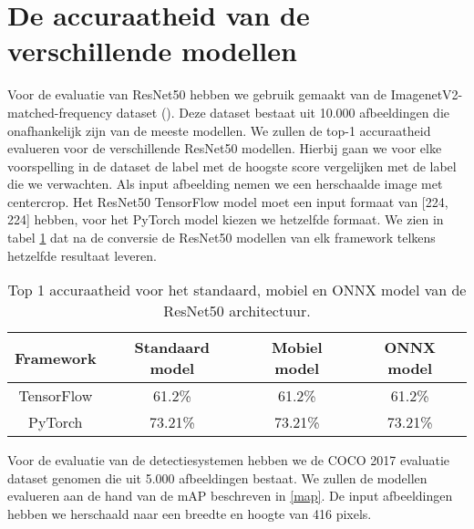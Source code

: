 \section{De accuraatheid van de verschillende modellen}

Voor de evaluatie van ResNet50 hebben we gebruik gemaakt van de ImagenetV2-matched-frequency dataset (\cite{recht2019imagenet}).
Deze dataset bestaat uit 10.000 afbeeldingen die onafhankelijk zijn van de meeste modellen.
We zullen de top-1 accuraatheid evalueren voor de verschillende ResNet50 modellen.
Hierbij gaan we voor elke voorspelling in de dataset de label met de hoogste score vergelijken met de label die we verwachten.
Als input afbeelding nemen we een herschaalde image met centercrop.
Het ResNet50 TensorFlow model moet een input formaat van [224, 224] hebben, voor het PyTorch model kiezen we hetzelfde formaat.
We zien in tabel \ref{tab:class_acc} dat na de conversie de ResNet50 modellen van elk framework telkens hetzelfde resultaat leveren.

\begin{table}[!ht]
    \caption{Top 1 accuraatheid voor het standaard, mobiel en ONNX model van de ResNet50 architectuur.}
\begin{tabular}{cccc}
    \hline
    Framework & Standaard model & Mobiel model & ONNX model \\
    \hline
    TensorFlow & 61.2\% & 61.2\% & 61.2\%  \\
    PyTorch & 73.21\% & 73.21\% & 73.21\%  \\
    \hline
\end{tabular}
\label{tab:class_acc}
\end{table}

Voor de evaluatie van de detectiesystemen hebben we de COCO 2017 evaluatie dataset genomen die uit 5.000 afbeeldingen bestaat.
We zullen de modellen evalueren aan de hand van de mAP beschreven in \ref{map}.
De input afbeeldingen hebben we herschaald naar een breedte en hoogte van 416 pixels.

